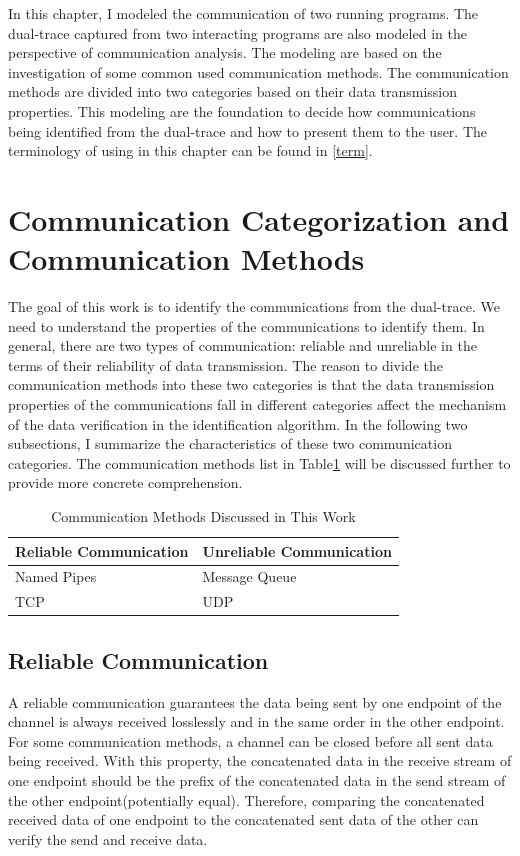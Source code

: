 
\label{chapter:Mod}
In this chapter, I modeled the communication of two running programs. The dual-trace captured from two interacting programs are also modeled in the perspective of communication analysis. The modeling are based on the investigation of some common used communication methods. The communication methods are divided into two categories based on their data transmission properties. This modeling are the foundation to decide how communications being identified from the dual-trace and how to present them to the user. The terminology of using in this chapter can be found in \ref{term}.

\section{Communication Categorization and Communication Methods}
The goal of this work is to identify the communications from the dual-trace. We need to understand the properties of the communications to identify them. In general, there are two types of communication: reliable and unreliable in the terms of their reliability of data transmission. The reason to divide the communication methods into these two categories is that the data transmission properties of the communications fall in different categories affect the mechanism of the data verification in the identification algorithm. In the following two subsections, I summarize the characteristics of these two communication categories. The communication methods list in Table\ref{methodsInCategories} will be discussed further to provide more concrete comprehension. 
\begin{table}[H]
\centering
\caption{Communication Methods Discussed in This Work}
\label{methodsInCategories}
\begin{tabular}{|l|l|}
 \hline
\textbf{Reliable Communication}& \textbf{Unreliable Communication}\\
 \hline
Named Pipes & Message Queue   \\
TCP &  UDP \\
 \hline
\end{tabular}
\end{table}


\subsection{Reliable Communication}\label{reliable}
A reliable communication guarantees the data being sent by one endpoint of the channel is always received losslessly and in the same order in the other endpoint. For some communication methods, a channel can be closed before all sent data being received. With this property, the concatenated data in the receive stream of one endpoint should be the prefix of the concatenated data in the send stream of the other endpoint(potentially equal). Therefore, comparing the concatenated received data of one endpoint to the concatenated sent data of the other can verify the send and receive data.

